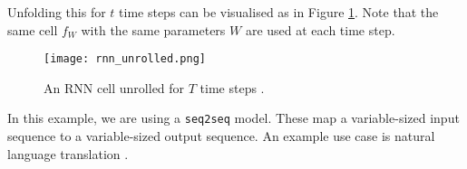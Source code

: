 Unfolding this for \(t\) time steps can be visualised as in Figure \ref{fig:2-rnn-unfolded}.
Note that the same cell \(f_W\) with the same parameters \(W\) are used at each time step.

\begin{figure}[h]
    \centering
    \texttt{[image: rnn\_unrolled.png]}
    \caption{An RNN cell unrolled for \(T\) time steps \cite[p.~29]{cs231n-rnns}.}
    \label{fig:2-rnn-unfolded}
\end{figure}
In this example, we are using a \texttt{seq2seq} model.
These map a variable-sized input sequence to a variable-sized output sequence.
An example use case is natural language translation \cite{GoogleAI-mt}.
